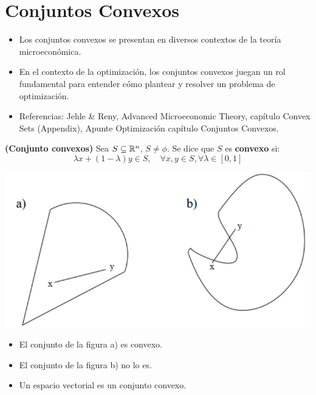 
\newpage
\section{Conjuntos Convexos}

\begin{itemize}
	\item Los conjuntos convexos se presentan en diversos contextos de la teoría microeconómica. 
	\bigskip 
	\item En el contexto de la optimización, los conjuntos convexos juegan un rol fundamental para entender cómo plantear y resolver un problema de optimización. 
	\bigskip 
	\item Referencias: Jehle \& Reny, Advanced Microeconomic Theory, capítulo Convex Sets (Appendix), Apunte Optimización capítulo Conjuntos Convexos. 
\end{itemize}


\begin{definicion}
	\textbf{(Conjunto convexos)}
	Sea $S \subseteq \mathbb{R}^n$, $S \neq \phi$. Se dice que $S$ es \textbf{convexo} si: 
	$$\lambda x + ( 1 - \lambda) y \in S ,\quad  \forall x, y \in S , \forall \lambda \in [0,1] $$
\end{definicion}
 
\begin{center}
	\includegraphics[scale=0.4]{figuras/capitulo2/1.conjuntos-convexos/ej-convexo.png}
\end{center}

	
\begin{itemize}
	\item El conjunto de la figura a) es convexo.  
	\item El conjunto de la figura b) no lo es.  
	\item Un espacio vectorial es un conjunto convexo.  
\end{itemize}

